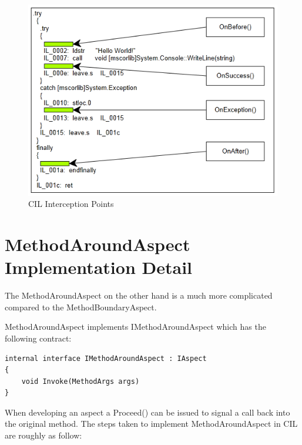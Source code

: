\begin{figure}[H]
  \includegraphics[scale=1.0]{MethodBoundaryOverview.PNG}
  \centering
  \caption{CIL Interception Points\label{methodboundary02}}
\end{figure}

\section{MethodAroundAspect Implementation Detail}

The MethodAroundAspect on the other hand is a much more complicated compared to the MethodBoundaryAspect.

MethodAroundAspect implements IMethodAroundAspect which has the following contract:

\begin{lstlisting}[caption={IMethodAroundAspect Interface}, label=aroundcontract]
internal interface IMethodAroundAspect : IAspect
{
	void Invoke(MethodArgs args)
}
\end{lstlisting}

When developing an aspect a Proceed() can be issued to signal a call back into the original method. The steps taken to implement MethodAroundAspect in CIL are roughly as follow:

